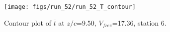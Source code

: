 \begin{figure}[H]
\centering
\texttt{[image: figs/run\_52/run\_52\_T\_contour]}
\caption{Contour plot of $\overline{t}$ at $z/c$=9.50, $V_{free}$=17.36, station 6.}
\label{fig:run_52_T_contour}
\end{figure}



